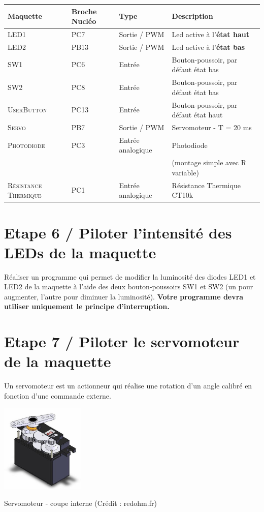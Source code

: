 \documentclass[a4paper,11pt,titlepage]{article} %
\begin{document}
\begin{center}
\begin{tabular}{|l|l|l|l|}
\hline 
Maquette & \textbf{Broche Nucléo} & Type & Description \\ 
\hline 
\textsc{LED1} & PC7 & Sortie / PWM & Led active à l'\textbf{état haut}\\ 
\textsc{LED2} & PB13 & Sortie / PWM & Led active à l'\textbf{état bas}\\ 
\hline 
\textsc{SW1} & PC6 & Entrée & Bouton-poussoir, par défaut état bas\\ 
\textsc{SW2} & PC8 & Entrée & Bouton-poussoir, par défaut état bas\\ 
\textsc{UserButton} & PC13 & Entrée & Bouton-poussoir, par défaut état haut\\
\hline 
\textsc{Servo} & PB7 & Sortie / PWM & Servomoteur - T = 20 ms\\ 
\hline 
\textsc{Photodiode} & PC3 & Entrée analogique & Photodiode \\
 & & & (montage simple avec R variable)\\ 
\hline 
\textsc{Résistance Thermique} & PC1 & Entrée analogique & Résistance Thermique CT10k\\ 
\hline 
\end{tabular} 
\end{center}


\section{Etape 6 / Piloter l'intensité des LEDs de la maquette}

\Manip Réaliser un programme qui permet de modifier la luminosité des diodes LED1 et LED2 de la maquette à l'aide des deux bouton-poussoirs SW1 et SW2 (un pour augmenter, l'autre pour diminuer la luminosité). \textbf{Votre programme devra utiliser uniquement le principe d'interruption.}

\newpage
\section{Etape 7 / Piloter le servomoteur de la maquette}

Un servomoteur est un actionneur qui réalise une rotation d'un angle calibré en fonction d'une commande externe.

\begin{center}
	\includegraphics[width=0.3\textwidth]{images/MINE_Nucleo_servomoteur-redohm.jpg}
	
	Servomoteur - coupe interne (Crédit : redohm.fr)
\end{center}
\end{document}
